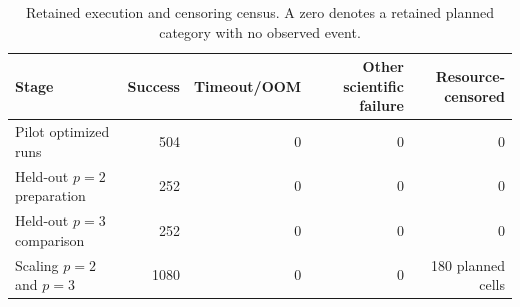 
\begin{table}[ht]
\centering
\caption{Retained execution and censoring census. A zero denotes a retained planned category with no observed event.}
\label{tab:failure-census}
\small
\begin{tabular}{@{}lrrrr@{}}
\toprule
Stage & Success & Timeout/OOM & Other scientific failure & Resource-censored \\
\midrule
Pilot optimized runs & 504 & 0 & 0 & 0 \\
Held-out $p=2$ preparation & 252 & 0 & 0 & 0 \\
Held-out $p=3$ comparison & 252 & 0 & 0 & 0 \\
Scaling $p=2$ and $p=3$ & 1080 & 0 & 0 & 180 planned cells \\
\bottomrule
\end{tabular}
\end{table}
